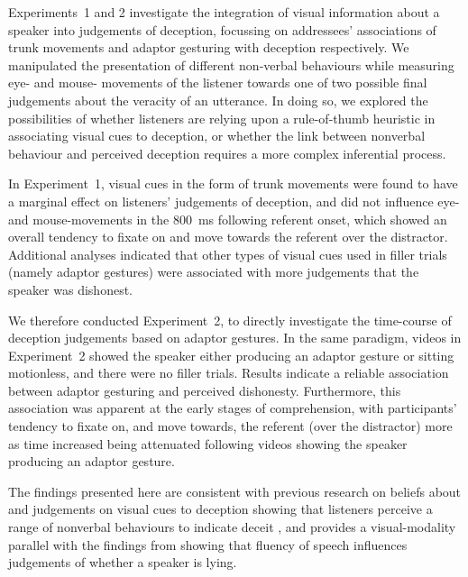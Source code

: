 \documentclass[a4paper,man,natbib]{apa6}
\begin{document}
Experiments~1 and 2 investigate the integration of visual information about a speaker into judgements of deception, focussing on addressees' associations of trunk movements and adaptor gesturing with deception respectively.
We manipulated the presentation of different non-verbal behaviours while measuring eye- and mouse- movements of the listener towards one of two possible final judgements about the veracity of an utterance.
In doing so, we explored the possibilities of whether listeners are relying upon a rule-of-thumb heuristic in associating visual cues to deception, or whether the link between nonverbal behaviour and perceived deception requires a more complex inferential process.

In Experiment~1, visual cues in the form of trunk movements were found to have a marginal effect on listeners' judgements of deception, and did not influence eye- and mouse-movements in the 800~ms following referent onset, which showed an overall tendency to fixate on and move towards the referent over the distractor.
Additional analyses indicated that other types of visual cues used in filler trials (namely adaptor gestures) were associated with more judgements that the speaker was dishonest. 

We therefore conducted Experiment~2, to directly investigate the time-course of deception judgements based on adaptor gestures.
In the same paradigm, videos in Experiment~2 showed the speaker either producing an adaptor gesture or sitting motionless, and there were no filler trials. 
Results indicate a reliable association between adaptor gesturing and perceived dishonesty.
Furthermore, this association was apparent at the early stages of comprehension, with participants' tendency to fixate on, and move towards, the referent (over the distractor) more as time increased being attenuated following videos showing the speaker producing an adaptor gesture.



The findings presented here are consistent with previous research on beliefs about and judgements on visual cues to deception showing that listeners perceive a range of nonverbal behaviours to indicate deceit \citep[e.g.][]{Zuckerman1981, Akehurst1996, Vrij2000}, and provides a visual-modality parallel with the findings from \citet{Loy2017} showing that fluency of speech influences judgements of whether a speaker is lying.

\end{document}
